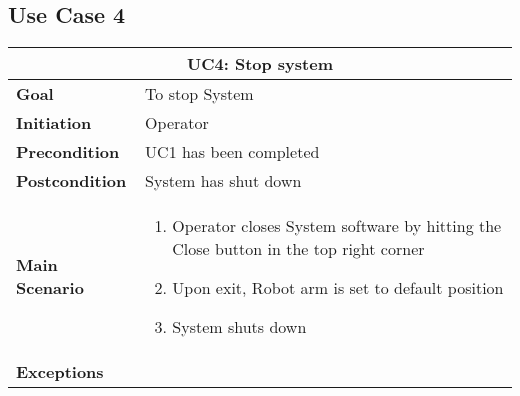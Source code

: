 \subsection{Use Case 4}
\begin{tabular}{ | l | p{} | }
  \hline
  \multicolumn{2}{|c|}{\textbf{UC4: Stop system}} \\ \hline
  \textbf{Goal} & To stop System \\ \hline
  \textbf{Initiation} & Operator \\ \hline
  \textbf{Precondition} & UC1 has been completed \\ \hline
  \textbf{Postcondition} & System has shut down  \\ \hline
  \textbf{Main Scenario} & 
  	{\begin{enumerate} 
  	\item Operator closes System software by hitting the Close button in the top right corner
  	\item Upon exit, Robot arm is set to default position
  	\item System shuts down
  	\end{enumerate}} \\ \hline
  \textbf{Exceptions} & \hspace{1cm} \\ \hline
\end{tabular}

\pagebreak
